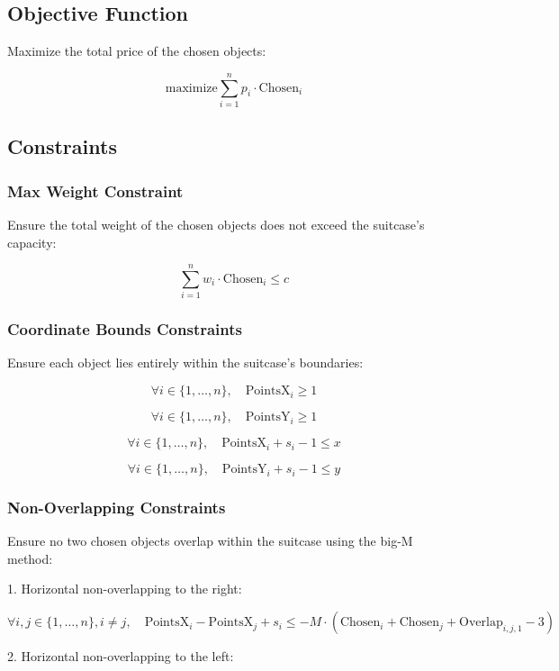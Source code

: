 \documentclass{article}
\begin{document}
\subsection{Objective Function}

Maximize the total price of the chosen objects:

\[
\text{maximize} \sum_{i=1}^n p_i \cdot \text{Chosen}_i
\]

\subsection{Constraints}

\subsubsection{Max Weight Constraint}

Ensure the total weight of the chosen objects does not exceed the suitcase's capacity:

\[
\sum_{i=1}^n w_i \cdot \text{Chosen}_i \leq c
\]

\subsubsection{Coordinate Bounds Constraints}

Ensure each object lies entirely within the suitcase's boundaries:

\[
\forall i \in \{1, \ldots, n\}, \quad \text{PointsX}_i \geq 1
\]

\[
\forall i \in \{1, \ldots, n\}, \quad \text{PointsY}_i \geq 1
\]

\[
\forall i \in \{1, \ldots, n\}, \quad \text{PointsX}_i + s_i - 1 \leq x
\]

\[
\forall i \in \{1, \ldots, n\}, \quad \text{PointsY}_i + s_i - 1 \leq y
\]

\subsubsection{Non-Overlapping Constraints}

Ensure no two chosen objects overlap within the suitcase using the big-M method:

1. Horizontal non-overlapping to the right:

\[
\forall i, j \in \{1, \ldots, n\}, i \neq j, \quad \text{PointsX}_i - \text{PointsX}_j + s_i \leq -M \cdot (\text{Chosen}_i + \text{Chosen}_j + \text{Overlap}_{i,j,1} - 3)
\]

2. Horizontal non-overlapping to the left:
\end{document}
